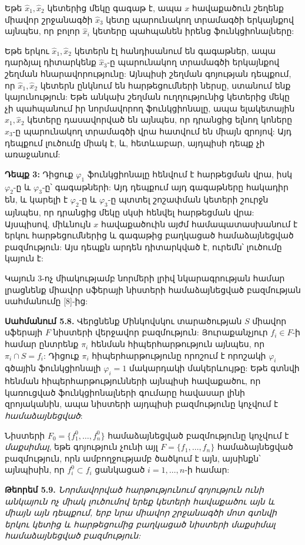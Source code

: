 \documentclass[12pt,a4paper]{article}
\numberwithin{equation}{section}
\numberwithin{figure}{section}
\begin{document}
Եթե $\hat{x}_1, \hat{x}_2$ կետերից մեկը գագաթ է, ապա $x$ հավաքածուն շեղենք միավոր շրջանագծի $\hat{x}_3$ կետը պարունակող տրամագծի երկայնքով այնպես, որ բոլոր $\hat{x}_i$ կետերը պահպանեն իրենց ֆունկցիոնալները:

Եթե երկու $\hat{x}_1, \hat{x}_2$ կետերն էլ հանդիսանում են գագաթներ, ապա դարձյալ դիտարկենք $\hat{x}_3$-ը պարունակող տրամագծի երկայնքով շեղման հնարավորությունը: Այնպիսի շեղման գոյության դեպքում, որ $\hat{x}_1, \hat{x}_2$ կետերն ընկնում են հարթեցումների ներսը, ստանում ենք կայունություն: Եթե անկախ շեղման ուղղությունից կետերից մեկը չի պահպանում իր նորմավորող ֆունկցիոնալը, ապա ելակետային $\hat{x}_1, \hat{x}_2$ կետերը դասավորված են այնպես, որ դրանցից ելնող կոները $\hat{x}_3$-ը պարունակող տրամագծի վրա հատվում են միայն զրոյով: Այդ դեպքում լուծումը միակ է, և, հետևաբար, այդպիսի դեպք չի առաջանում:

\textbf{Դեպք 3:} Դիցուք $\varphi_1$ ֆունկցիոնալը հենվում է հարթեցման վրա, իսկ $\varphi_2$-ը և $\varphi_3$-ը՝ գագաթների: Այդ դեպքում այդ գագաթները հակադիր են, և կարելի է $\varphi_2$-ը և $\varphi_3$-ը պտտել շոշափման կետերի շուրջն այնպես, որ դրանցից մեկը սկսի հենվել հարթեցման վրա: Այսպիսով, միևնույն $x$ հավաքածուին այժմ համապատասխանում է երկու հարթեցումներից և գագաթից բաղկացած համաձայնեցված բազմություն: Այս դեպքն արդեն դիտարկված է, ուրեմն՝ լուծումը կայուն է: 

Կայուն 3-ոչ միակությամբ նորմերի լրիվ նկարագրության համար լրացնենք միավոր սֆերայի նիստերի համաձայնեցված բազմության սահմանումը [8]-ից:

\textbf{Սահմանում 5.8.} Վերցնենք Մինկովսկու տարածության $S$ միավոր սֆերայի $F$ նիստերի վերջավոր բազմություն: Յուրաքանչյուր $f_i \in F$-ի համար ընտրենք $\pi_i$ հենման հիպերհարթություն այնպես, որ $\pi_i \cap S = f_i$: Դիցուք $\pi_i$ հիպերհարթությունը որոշում է որոշակի $\varphi_i$ գծային ֆունկցիոնալի $\varphi_i = 1$ մակարդակի մակերևույթը: Եթե գտնվի հենման հիպերհարթությունների այնպիսի հավաքածու, որ կառուցված ֆունկցիոնալների գումարը հավասար լինի զրոյականին, ապա նիստերի այդպիսի բազմությունը կոչվում է \textit{համաձայնեցված}:

Նիստերի $F_0 = \{f_1^0, \dots, f_n^0\}$ համաձայնեցված բազմությունը կոչվում է \textit{մաքսիմալ}, եթե գոյություն չունի այլ $F = \{f_1, \dots, f_n\}$ համաձայնեցված բազմություն, որն ամբողջությամբ ծածկում է այն, այսինքն՝ այնպիսին, որ $f_i^0 \subset f_i$ ցանկացած $i = 1, \dots, n$-ի համար:

\textbf{Թեորեմ 5.9.} \textit{Նորմավորված հարթությունում գոյություն ունի անկայուն ոչ միակ լուծումով երեք կետերի հավաքածու այն և միայն այն դեպքում, երբ նրա միավոր շրջանագծի մոտ գտնվի երկու կետից և հարթեցումից բաղկացած նիստերի մաքսիմալ համաձայնեցված բազմություն:}
\end{document}

